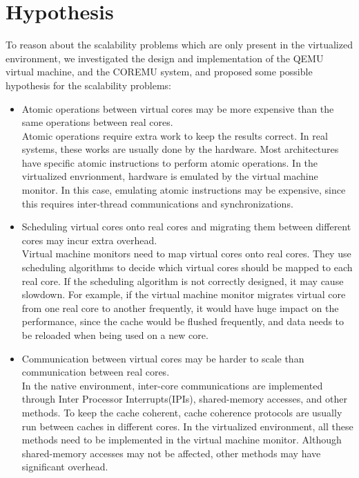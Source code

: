 \section{Hypothesis}
To reason about the scalability problems which are only present in the
virtualized environment, we investigated the design and implementation
of the QEMU virtual machine, and the COREMU system, and proposed some
possible hypothesis for the scalability problems:

\begin{itemize}
	\item Atomic operations between virtual cores may be more expensive
		than the same operations between real cores.\\
		Atomic operations require extra work to keep the results correct.
		In real systems, these works are usually done by the hardware.
		Most architectures have specific atomic instructions to perform
		atomic operations. In the virtualized envrionment, hardware is
		emulated by the virtual machine monitor. In this case, emulating
		atomic instructions may be expensive, since this requires
		inter-thread communications and synchronizations.
	\item Scheduling virtual cores onto real cores and migrating them
		between different cores may incur extra overhead. \\
		Virtual machine monitors need to map virtual cores onto real cores.
		They use scheduling algorithms to decide which virtual cores should
		be mapped to each real core. If the scheduling algorithm is not
		correctly designed, it may cause slowdown. For example, if the
		virtual machine monitor migrates virtual core from one real core
		to another frequently, it would have huge impact on the performance,
		since the cache would be flushed frequently, and data needs to be
		reloaded when being used on a new core.
	\item Communication between virtual cores may be harder to scale
		than communication between real cores. \\
		In the native environment, inter-core communications are implemented
		through Inter Processor Interrupts(IPIs), shared-memory accesses,
		and other methods. To keep the cache coherent, cache coherence
		protocols are usually run between caches in different cores. In
		the virtualized environment, all these methods need to be implemented
		in the virtual machine monitor. Although shared-memory accesses may
		not be affected, other methods may have significant overhead.
\end{itemize}
